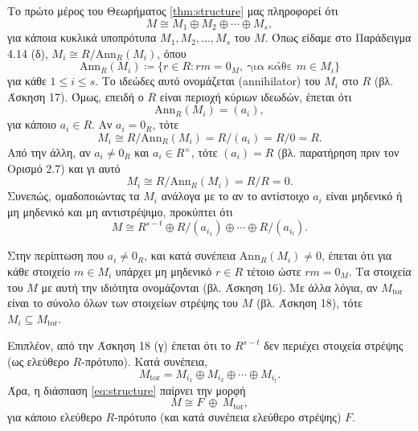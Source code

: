 \documentclass[12pt,a4paper,reqno]{amsart}
\theoremstyle{definition}
\theoremstyle{remark}
\numberwithin{theorem}{section}
\numberwithin{exercise}{section}
\numberwithin{equation}{section}
\newcommand{\Ann}{\mathrm{Ann}}
\newcommand{\tor}{\mathrm{tor}}
\newcommand{\defn}[1]{{\color{mylightblue}{#1}}}
\begin{document}
Το πρώτο μέρος του Θεωρήματος \ref{thm:structure} μας πληροφορεί ότι 
\[
M \cong M_1 \oplus M_2 \oplus \cdots \oplus M_s,
\]
για κάποια κυκλικά υποπρότυπα $M_1, M_2, \dots, M_s$ του $M$. Όπως είδαμε στο Παράδειγμα 4.14 (δ), $M_i \cong R/\Ann_R(M_i)$, όπου 
\[
\Ann_R(M_i) \coloneqq \{r \in R : rm=0_M, \ \text{για κάθε $m \in M_i$}\}
\]
για κάθε $1 \le i \le s$. Το ιδεώδες αυτό ονομάζεται \defn{μηδενιστής} (annihilator) του $M_i$ στο $R$ (βλ. Άσκηση 17). Όμως, επειδή ο $R$ είναι περιοχή κύριων ιδεωδών, έπεται ότι  
\[
\Ann_R(M_i) = (a_i),
\] 
για κάποιο $a_i \in R$. Aν $a_i = 0_R$, τότε 
\[
M_i \cong R/\Ann_R(M_i) = R/(a_i) = R/0 = R.
\] 
Από την άλλη, αν $a_i \neq 0_R$ και $a_i \in R^\times$, τότε $(a_i) = R$ (βλ. παρατήρηση πριν τον Ορισμό 2.7) και γι αυτό 
\[
M_i \cong R/\Ann_R(M_i) = R/R = 0.
\]
Συνεπώς, ομαδοποιώντας τα $M_i$ ανάλογα με το αν το αντίστοιχο $a_i$ είναι μηδενικό ή μη μηδενικό και μη αντιστρέψιμο, προκύπτει ότι
\begin{equation}  
    \label{eq:structure}
    M \cong R^{s-t} \oplus R/(a_{i_1}) \oplus \cdots \oplus R/(a_{i_t}).
\end{equation}

Στην περίπτωση που $a_i \neq 0_R$, και κατά συνέπεια $\Ann_R(M_i) \neq 0$, έπεται ότι για κάθε στοιχείο $m \in M_i$ υπάρχει μη μηδενικό $r \in R$ τέτοιο ώστε $rm = 0_M$. Τα στοιχεία του $M$ με αυτή την ιδιότητα ονομάζονται \defn{στοιχεία στρέψης} (βλ. Άσκηση 16). Με άλλα λόγια, αν $M_\tor$ είναι το σύνολο όλων των στοιχείων στρέψης του $M$ (βλ. Άσκηση 18), τότε $M_i \subseteq M_\tor$.

Επιπλέον, από την Άσκηση 18 (γ) έπεται ότι το $R^{s-t}$ δεν περιέχει στοιχεία στρέψης (ως ελεύθερο $R$-πρότυπο). Κατά συνέπεια, 
\[
M_{\tor} = M_{i_1} \oplus M_{i_2} \oplus \cdots \oplus M_{i_t}.
\]
Άρα, η διάσπαση \eqref{eq:structure} παίρνει την μορφή 
\begin{equation}
    \label{eq:structure_2}
    M \cong F\ \oplus \ M_\tor,
\end{equation}
για κάποιο ελεύθερο $R$-πρότυπο (και κατά συνέπεια ελεύθερο στρέψης) $F$.
\end{document}
